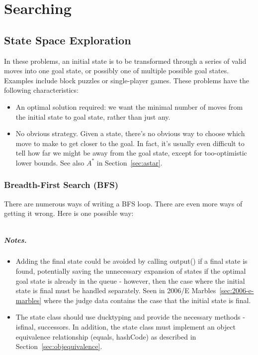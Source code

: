 \chapter{Searching}
\def\astar{$A^*$}

 

\section{State Space Exploration}

In these problems, an initial state is to be transformed through a series of valid
moves into one goal state, or possibly one of multiple possible goal states. 
Examples include block puzzles or single-player games.
These problems have the following characteristics:
\begin{itemize}
\item An optimal solution required: we want the minimal number of moves from the
initial state to goal state, rather than just any.

\item No obvious strategy.  Given a state, there's no obvious way to choose which
move to make to get closer to the goal.  In fact, it's usually even difficult to
tell how far we might be away from the goal state, except for too-optimistic
lower bounds.  See also \astar{} in Section~\ref{sec:astar}.

\end{itemize}

\subsection{Breadth-First Search (BFS)}
\label{sec:bfs}
There are numerous ways of writing a BFS loop.  There are even more ways of
getting it wrong.
Here is one possible way:

\inputminted[fontsize=\footnotesize,linenos=true]{java}{code/bfsloop.java}

\paragraph{Notes.}  
\begin{itemize}
\item Adding the final state could be avoided by calling output() if a 
final state is found, potentially saving the unnecessary expansion of states
if the optimal goal state is already in the queue - however, then the case where 
the initial state is final must be handled separately.  
Seen in 2006/E Marbles~\ref{sec:2006-e-marbles} where the judge data contains
the case that the initial state is final.

\item The state class should use ducktyping and provide the necessary
methods - isfinal, successors.  In addition, the state class must implement
an object equivalence relationship (equals, hashCode) as described in 
Section~\ref{sec:objequivalence}.
\end{itemize}

